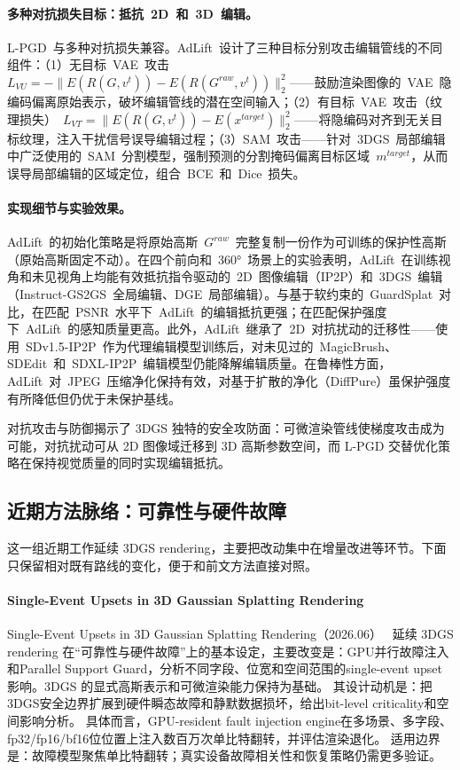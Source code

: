 \paragraph{多种对抗损失目标：抵抗~2D~和~3D~编辑。}
L-PGD~与多种对抗损失兼容。AdLift~设计了三种目标分别攻击编辑管线的不同组件：（1）无目标~VAE~攻击~$L_{VU} = -\|E(R(G, v^t)) - E(R(G^{raw}, v^t))\|_2^2$——鼓励渲染图像的~VAE~隐编码偏离原始表示，破坏编辑管线的潜在空间输入；（2）有目标~VAE~攻击（纹理损失）~$L_{VT} = \|E(R(G, v^t)) - E(x^{target})\|_2^2$——将隐编码对齐到无关目标纹理，注入干扰信号误导编辑过程；（3）SAM~攻击——针对~3DGS~局部编辑中广泛使用的~SAM~分割模型，强制预测的分割掩码偏离目标区域~$m^{target}$，从而误导局部编辑的区域定位，组合~BCE~和~Dice~损失。

\paragraph{实现细节与实验效果。}
AdLift~的初始化策略是将原始高斯~$G^{raw}$~完整复制一份作为可训练的保护性高斯（原始高斯固定不动）。在四个前向和~360°~场景上的实验表明，AdLift~在训练视角和未见视角上均能有效抵抗指令驱动的~2D~图像编辑（IP2P）和~3DGS~编辑（Instruct-GS2GS~全局编辑、DGE~局部编辑）。与基于软约束的~GuardSplat~对比，在匹配~PSNR~水平下~AdLift~的编辑抵抗更强；在匹配保护强度下~AdLift~的感知质量更高。此外，AdLift~继承了~2D~对抗扰动的迁移性——使用~SDv1.5-IP2P~作为代理编辑模型训练后，对未见过的~MagicBrush、SDEdit~和~SDXL-IP2P~编辑模型仍能降解编辑质量。在鲁棒性方面，AdLift~对~JPEG~压缩净化保持有效，对基于扩散的净化（DiffPure）虽保护强度有所降低但仍优于未保护基线。

\begin{takeaway}
对抗攻击与防御揭示了 3DGS 独特的安全攻防面：可微渲染管线使梯度攻击成为可能，对抗扰动可从 2D 图像域迁移到 3D 高斯参数空间，而 L-PGD 交替优化策略在保持视觉质量的同时实现编辑抵抗。
\end{takeaway}


\subsection{近期方法脉络：可靠性与硬件故障}

这一组近期工作延续 3DGS rendering，主要把改动集中在增量改进等环节。下面只保留相对既有路线的变化，便于和前文方法直接对照。

\paragraph{Single-Event Upsets in 3D Gaussian Splatting Rendering}
Single-Event Upsets in 3D Gaussian Splatting Rendering（2026.06）~\cite{2606_21791} 延续 3DGS rendering 在“可靠性与硬件故障”上的基本设定，主要改变是：GPU并行故障注入和Parallel Support Guard，分析不同字段、位宽和空间范围的single-event upset影响。3DGS 的显式高斯表示和可微渲染能力保持为基础。
其设计动机是：把3DGS安全边界扩展到硬件瞬态故障和静默数据损坏，给出bit-level criticality和空间影响分析。
具体而言，GPU-resident fault injection engine在多场景、多字段、fp32/fp16/bf16位位置上注入数百万次单比特翻转，并评估渲染退化。
适用边界是：故障模型聚焦单比特翻转；真实设备故障相关性和恢复策略仍需更多验证。
